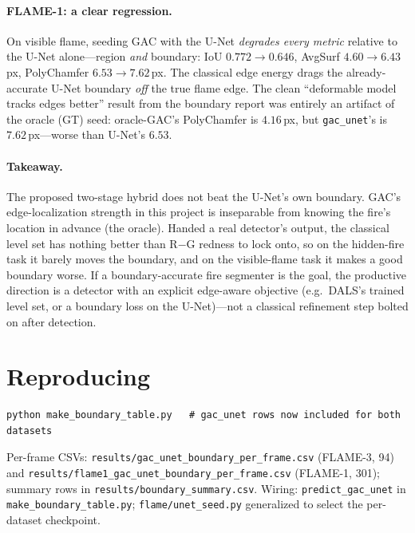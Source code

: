 \documentclass[10pt]{article}
\begin{document}
\paragraph{FLAME-1: a clear regression.} On visible flame, seeding GAC with the
U-Net \emph{degrades every metric} relative to the U-Net alone---region
\emph{and} boundary: IoU $0.772\to0.646$, AvgSurf $4.60\to6.43$\,px, PolyChamfer
$6.53\to7.62$\,px. The classical edge energy drags the already-accurate U-Net
boundary \emph{off} the true flame edge. The clean ``deformable model tracks
edges better'' result from the boundary report was entirely an artifact of the
oracle (GT) seed: oracle-GAC's PolyChamfer is $4.16$\,px, but \texttt{gac\_unet}'s
is $7.62$\,px---worse than U-Net's $6.53$.

\paragraph{Takeaway.} The proposed two-stage hybrid does not beat the U-Net's own
boundary. GAC's edge-localization strength in this project is inseparable from
knowing the fire's location in advance (the oracle). Handed a real detector's
output, the classical level set has nothing better than R$-$G redness to lock
onto, so on the hidden-fire task it barely moves the boundary, and on the
visible-flame task it makes a good boundary worse. If a boundary-accurate fire
segmenter is the goal, the productive direction is a detector with an explicit
edge-aware objective (e.g.\ DALS's trained level set, or a boundary loss on the
U-Net)---not a classical refinement step bolted on after detection.

\section{Reproducing}

\begin{verbatim}
python make_boundary_table.py   # gac_unet rows now included for both datasets
\end{verbatim}

Per-frame CSVs: \texttt{results/gac\_unet\_boundary\_per\_frame.csv} (FLAME-3, 94)
and \texttt{results/flame1\_gac\_unet\_boundary\_per\_frame.csv} (FLAME-1, 301);
summary rows in \texttt{results/boundary\_summary.csv}. Wiring:
\texttt{predict\_gac\_unet} in \texttt{make\_boundary\_table.py};
\texttt{flame/unet\_seed.py} generalized to select the per-dataset checkpoint.
\end{document}
